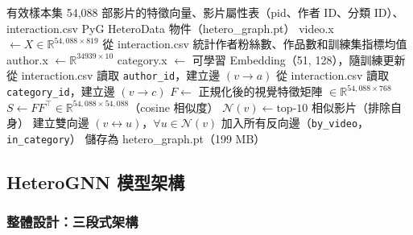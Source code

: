 \documentclass[12pt, a4paper]{article}
\begin{document}
\begin{algorithm}[H]
\caption{異質圖建構}
\label{alg:graph}
\begin{algorithmic}[1]
\Require 有效樣本集 54,088 部影片的特徵向量、影片屬性表（pid、作者 ID、分類 ID）、interaction.csv
\Ensure PyG HeteroData 物件（hetero\_graph.pt）
\State video.x $\leftarrow X \in \mathbb{R}^{54{,}088\times819}$
\State 從 interaction.csv 統計作者粉絲數、作品數和訓練集指標均值
\State author.x $\leftarrow \mathbb{R}^{34939\times10}$
\State category.x $\leftarrow$ 可學習 Embedding（51, 128），隨訓練更新
  \State 從 interaction.csv 讀取 \texttt{author\_id}，建立邊 $(v \to a)$
\EndFor
{}
  \State 從 interaction.csv 讀取 \texttt{category\_id}，建立邊 $(v \to c)$
\EndFor
{}
\State $F \leftarrow$ 正規化後的視覺特徵矩陣 $\in \mathbb{R}^{54{,}088\times768}$
\State $S \leftarrow F F^\top \in \mathbb{R}^{54{,}088\times54{,}088}$（cosine 相似度）
  \State $\mathcal{N}(v) \leftarrow \mathrm{top\text{-}}10$ 相似影片（排除自身）
  \State 建立雙向邊 $(v \leftrightarrow u)$，$\forall u\in\mathcal{N}(v)$
\EndFor
\State 加入所有反向邊（\texttt{by\_video}，\texttt{in\_category}）
\State 儲存為 hetero\_graph.pt（199 MB）
\end{algorithmic}
\end{algorithm}

\subsection{HeteroGNN 模型架構}

\subsubsection{整體設計：三段式架構}
\end{document}
